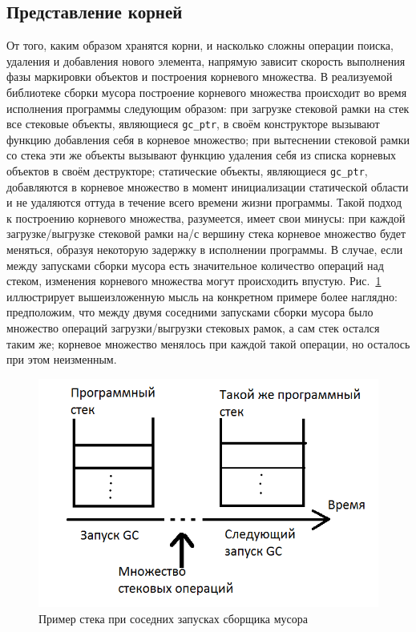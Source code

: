 \subsection{Представление корней}
От того, каким образом хранятся корни, и насколько сложны операции поиска, удаления и добавления нового элемента,
напрямую зависит скорость выполнения фазы маркировки объектов и построения корневого множества.
В реализуемой библиотеке сборки мусора построение корневого множества происходит во время исполнения программы
следующим образом: при загрузке стековой рамки на стек все стековые объекты,
являющиеся \lstinline[language= cpp]{gc_ptr}, в своём конструкторе вызывают функцию добавления себя в корневое множество;
при вытеснении стековой рамки со стека эти же объекты вызывают функцию удаления себя из списка корневых объектов
в своём деструкторе; статические объекты, являющиеся \lstinline[language= cpp]{gc_ptr}, добавляются в корневое множество
в момент инициализации статической области и не удаляются оттуда в течение всего времени жизни программы.
Такой подход к построению корневого множества, разумеется, имеет свои минусы: при каждой загрузке/выгрузке
стековой рамки на/с вершину стека корневое множество будет меняться, образуя некоторую
задержку в исполнении программы. В случае, если между запусками сборки мусора есть значительное количество операций
над стеком, изменения корневого множества могут происходить впустую. Рис.~\ref{fig:stackLive} иллюстрирует вышеизложенную мысль
на конкретном примере более наглядно: предположим, что между двумя соседними запусками сборки мусора было множество
операций загрузки/выгрузки стековых рамок, а сам стек остался таким же; корневое множество менялось при каждой такой
операции, но осталось при этом неизменным.

\begin{figure}[t]
	\centering
	\includegraphics[width=0.7\linewidth]{Berezun/images/picture1.png}
	\caption{Пример стека при соседних запусках сборщика мусора}
	\label{fig:stackLive}
\end{figure}

